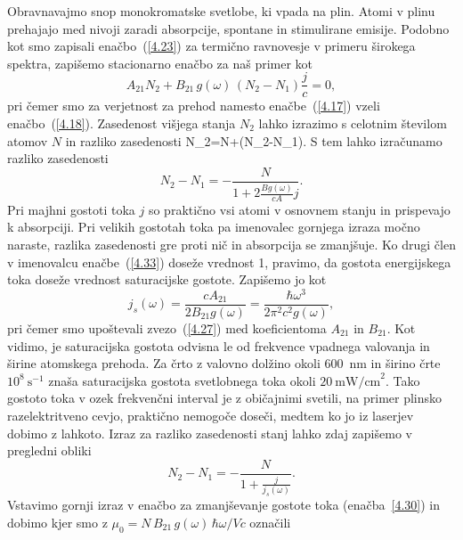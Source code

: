 \noindent
Obravnavajmo snop monokromatske svetlobe, ki vpada na plin. 
Atomi v plinu prehajajo med nivoji zaradi absorpcije, spontane in stimulirane emisije. 
Podobno kot smo zapisali enačbo~(\ref{4.23}) za termično ravnovesje v primeru
širokega spektra, zapišemo stacionarno enačbo za naš primer kot
\begin{equation}
A_{21}N_{2}+B_{21}\,g(\omega)\,(N_{2}-N_{1})\frac{j}{c}=0,
\label{4.32}
\end{equation}
pri čemer smo za verjetnost za prehod namesto enačbe~(\ref{4.17}) vzeli
enačbo~(\ref{4.18}). Zasedenost višjega stanja $N_{2}$ lahko izrazimo s 
celotnim številom atomov $N$ in razliko zasedenosti 
\beq
N_{2}=N+(N_{2}-N_{1}).
\label{4.321}
\eeq
S tem lahko izračunamo razliko zasedenosti 
\begin{equation}
N_{2}-N_{1}=-\frac{N}{1+2\frac{Bg(\omega)}{cA}j}.
\label{4.33}
\end{equation}
Pri majhni gostoti toka $j$ so praktično vsi atomi v osnovnem stanju in prispevajo
k absorpciji. Pri velikih gostotah toka pa imenovalec gornjega
izraza močno naraste, razlika zasedenosti gre proti nič in absorpcija se zmanjšuje.
Ko drugi člen v imenovalcu enačbe~(\ref{4.33}) doseže vrednost 1, pravimo, da
gostota energijskega toka doseže vrednost saturacijske gostote.
Zapišemo jo kot 
\begin{equation}
j_{s}(\omega)=\frac{cA_{21}}{2B_{21}g(\omega)}=
\frac{\hbar\omega^{3}}{2\pi^{2}c^{2}g(\omega)},
\label{4.34}
\end{equation}
pri čemer smo upoštevali zvezo~(\ref{4.27}) med koeficientoma $A_{21}$ in $B_{21}$.
Kot vidimo, je saturacijska gostota odvisna le od frekvence vpadnega valovanja 
in širine atomskega prehoda. Za črto z valovno dolžino okoli 600~nm in širino črte
$10^{8}~\mathrm{s}^{-1}$ znaša saturacijska gostota svetlobnega toka okoli 
$20~\mathrm{mW/cm}^{2}$. Tako gostoto toka v ozek frekvenčni interval
je z običajnimi svetili, na primer plinsko razelektritveno cevjo,
praktično nemogoče doseči, medtem ko jo iz laserjev dobimo z lahkoto.
Izraz za razliko zasedenosti stanj lahko zdaj zapišemo v pregledni obliki
\begin{equation}
N_{2}-N_{1}=-\frac{N}{1+\frac{j}{j_{s}(\omega)}}.
\label{4.35}
\end{equation}
Vstavimo gornji izraz v enačbo za zmanjševanje gostote toka (enačba~\ref{4.30}) in 
dobimo 
kjer smo z $\mu_{0}=N\,B_{21}\,g(\omega)\,\hbar\omega/Vc$ označili
